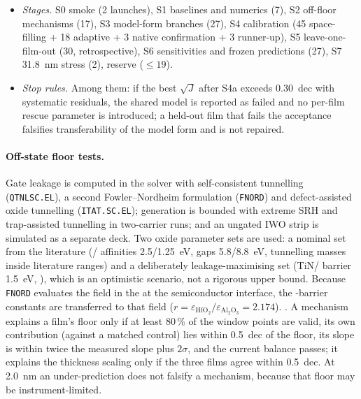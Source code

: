 \begin{itemize}
\item \emph{Stages.} S0 smoke (2 launches), S1 baselines and numerics (7), S2 off-floor mechanisms (17), S3 model-form
branches (27), S4 calibration (45 space-filling + 18 adaptive + 3 native confirmation + 3 runner-up), S5
leave-one-film-out (30, retrospective), S6 sensitivities and frozen predictions (27), S7 \SI{31.8}{nm} stress (2),
reserve ($\le 19$). %
\item \emph{Stop rules.} Among them: if the best $\sqrt J$ after S4a exceeds \SI{0.30}{dec} with systematic residuals,
the shared model is reported as failed and no per-film rescue parameter is introduced; a held-out film that fails the
acceptance falsifies transferability of the model form and is not repaired. %
\end{itemize}

\paragraph{Off-state floor tests.} Gate leakage is computed in the solver with self-consistent tunnelling
(\texttt{QTNLSC.EL}), a second Fowler--Nordheim formulation (\texttt{FNORD}) and defect-assisted oxide tunnelling
(\texttt{ITAT.SC.EL}); generation is bounded with extreme SRH and trap-assisted tunnelling in two-carrier runs; and an
ungated IWO strip is simulated as a separate deck. %
Two oxide parameter sets are used: a nominal set from the literature (\HfO{}/\AlO{} affinities 2.5/1.25~eV, gaps
5.8/8.8~eV, tunnelling masses  inside literature ranges) and a deliberately leakage-maximising set
(TiN/\HfO{} barrier 1.5~eV, ), which is an optimistic scenario, not a rigorous upper bound. %
Because \texttt{FNORD} evaluates the field in the \AlO{} at the semiconductor interface, the \HfO{}-barrier constants
are transferred to that field ($r = \varepsilon_{\mathrm{HfO_2}}/\varepsilon_{\mathrm{Al_2O_3}} = 2.174$). %
.
A mechanism explains a film's floor only if at least 80\,\% of the window points are valid, its own contribution
(against a matched control) lies within \SI{0.5}{dec} of the floor, its slope is within twice the measured slope plus
$2\sigma$, and the current balance passes; it explains the thickness scaling only if the three films agree within
\SI{0.5}{dec}. At \SI{2.0}{nm} an under-prediction does not falsify a mechanism, because that floor may be
instrument-limited. %


